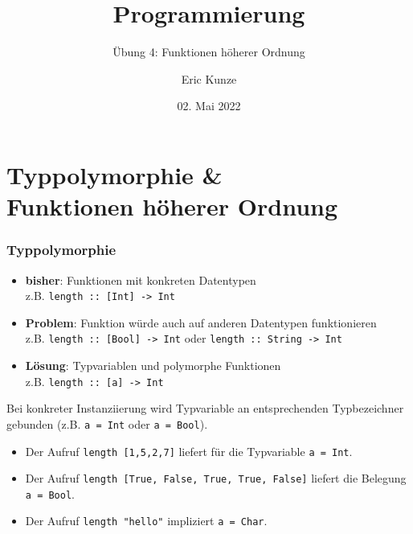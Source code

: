 \documentclass{beamer}
\begin{document}
	
	\title{Programmierung}
	\subtitle{Übung 4: Funktionen höherer Ordnung}
	\author{Eric Kunze}
	\date{02. Mai 2022}
	
	\maketitle
	


\section{Typpolymorphie \& \\ Funktionen höherer Ordnung}

\begin{frame}[fragile, t] \frametitle{Typpolymorphie}
	\footnotesize
	\begin{itemize}
		\item \textbf{bisher}: Funktionen mit konkreten Datentypen \\
		z.B. \texttt{length :: [Int] -> Int}
		\item \textbf{Problem}: Funktion würde auch auf anderen Datentypen funktionieren \\
		z.B. \texttt{length :: [Bool] -> Int} oder \texttt{length :: String -> Int}
		\item \textbf{Lösung}: Typvariablen und polymorphe Funktionen \\
		z.B. \texttt{length :: [\alert{a}] -> Int}
	\end{itemize}
	
	\pause
	
	Bei konkreter Instanziierung wird Typvariable an entsprechenden Typbezeichner gebunden (z.B. \texttt{\alert{a} = Int} oder \texttt{\alert{a} = Bool}).
	
	\begin{itemize}
		\item Der Aufruf \texttt{length [1,5,2,7]} liefert für die Typvariable \texttt{\alert{a} = Int}.
		\item Der Aufruf \texttt{length [True, False, True, True, False]} liefert die Belegung \texttt{\alert{a} = Bool}.
		\item Der Aufruf \texttt{length "hello"} impliziert \texttt{\alert{a} = Char}.
	\end{itemize}
\end{frame}
\end{document}

